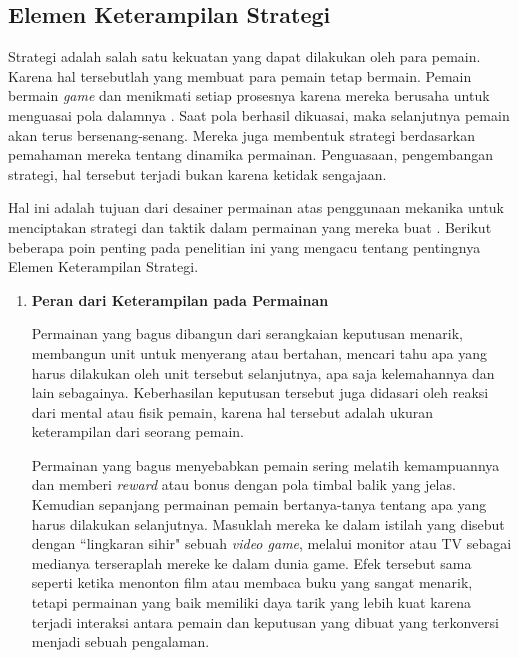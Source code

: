 \begin{subs}
\begin{enumerate}[label=\textbf{\alph*).}]
	\end{enumerate}
	
	\subsection{Elemen Keterampilan Strategi}
	\label{sec:sub_sec2_strategi}
	\vspace{1ex}
	
	Strategi adalah salah satu kekuatan yang dapat dilakukan oleh para pemain. Karena hal tersebutlah yang membuat para pemain tetap bermain. Pemain bermain \textit{game} dan menikmati setiap prosesnya karena mereka berusaha untuk menguasai pola dalamnya \citep{Koster2013}. Saat pola berhasil dikuasai, maka selanjutnya pemain akan terus bersenang-senang. Mereka juga membentuk strategi berdasarkan pemahaman mereka tentang dinamika permainan. Penguasaan, pengembangan strategi, hal tersebut terjadi bukan karena ketidak sengajaan. 
	\vspace{1ex}
	
	Hal ini adalah tujuan dari desainer permainan atas penggunaan mekanika untuk menciptakan strategi dan taktik dalam permainan yang mereka buat \cite{Brathwaite2009}. Berikut beberapa poin penting pada penelitian ini yang mengacu tentang pentingnya Elemen Keterampilan Strategi.
	\vspace{1ex}

	\begin{enumerate}[label=\textbf{\alph*).}]
		
		\item \textbf{Peran dari Keterampilan pada Permainan}
		\setlength{\parindent}{0.8cm}
	
		Permainan yang bagus dibangun dari serangkaian keputusan menarik, membangun unit untuk menyerang atau bertahan, mencari tahu apa yang harus dilakukan oleh unit tersebut selanjutnya, apa saja kelemahannya dan lain sebagainya. Keberhasilan keputusan tersebut juga didasari oleh reaksi dari mental atau fisik pemain, karena hal tersebut adalah ukuran keterampilan dari seorang pemain.
		\vspace{1ex}
	
		Permainan yang bagus menyebabkan pemain sering melatih kemampuannya dan memberi \textit{reward} atau bonus dengan pola timbal balik yang jelas. Kemudian sepanjang permainan pemain bertanya-tanya tentang apa yang harus dilakukan selanjutnya. Masuklah mereka ke dalam istilah yang disebut dengan ``lingkaran sihir" sebuah \textit{video game}, melalui monitor atau TV sebagai medianya terseraplah mereke ke dalam dunia game. Efek tersebut sama seperti ketika menonton film atau membaca buku yang sangat menarik, tetapi permainan yang baik memiliki daya tarik yang lebih kuat karena terjadi interaksi antara pemain dan keputusan yang dibuat yang terkonversi menjadi sebuah pengalaman.
		\vspace{1ex}
		

\end{enumerate}
\end{subs}
